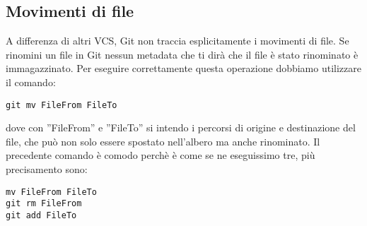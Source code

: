 \subsection{Movimenti di file}
A differenza di altri VCS, Git non traccia esplicitamente i movimenti di file. Se rinomini un file in Git nessun metadata che ti dirà che il file è stato rinominato è immagazzinato. Per eseguire correttamente questa operazione dobbiamo utilizzare il comando:

\begin{center}
\texttt{git mv FileFrom FileTo}
\end{center}

dove con ''FileFrom'' e ''FileTo'' si intendo i percorsi di origine e destinazione del file, che può non solo essere spostato nell'albero ma anche rinominato. Il precedente comando è comodo perchè è come se ne eseguissimo tre, più precisamento sono:

\begin{center}
\texttt{mv FileFrom FileTo}\\
\texttt{git rm FileFrom}\\
\texttt{git add FileTo}
\end{center}